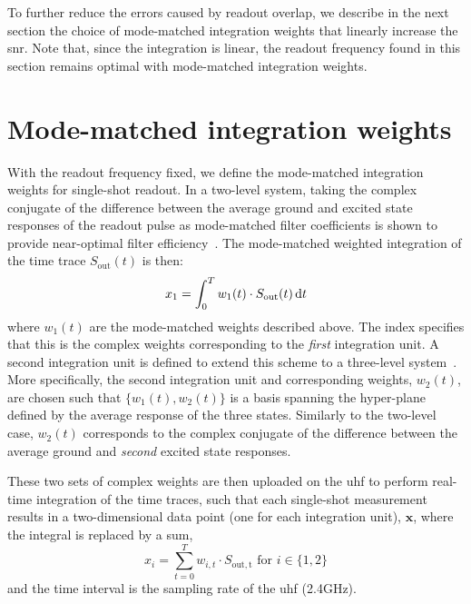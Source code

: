 To further reduce the errors caused by readout overlap, we describe in the next section the choice of mode-matched integration weights that linearly increase the \gls{snr}. Note that, since the integration is linear, the readout frequency found in this section remains optimal with mode-matched integration weights.

\section{Mode-matched integration weights} \label{s:mode_matched_integration}
With the readout frequency fixed, we define the mode-matched integration weights for single-shot readout. In a two-level system, taking the complex conjugate of the difference between the average ground and excited state responses of the readout pulse as mode-matched filter coefficients is shown to provide near-optimal filter efficiency~\cite{Heinsoo2018, Gambetta2007, Bultink2018}. The mode-matched weighted integration of the time trace $S_{\mathrm{out}}(t)$ is then: 
\begin{equation}
    x_1 = \int_{0}^{T}{w_{1}(t)\cdot S_{\mathrm{out}}(t)\,\mathrm d t} 
\end{equation}
where $w_{1}(t)$ are the mode-matched weights described above. The index specifies that this is the complex weights corresponding to the \textit{first} integration unit.
A second integration unit is defined to extend this scheme to a three-level system~\cite{Reuer2018}. More specifically, the second integration unit and corresponding weights, $w_2(t)$, are chosen such that $\{w_{1}(t), w_{2}(t)\}$ is a basis spanning the hyper-plane defined by the average response of the three states. Similarly to the two-level case, $w_{2}(t)$ corresponds to the complex conjugate of the difference between the average ground and \textit{second} excited state responses.

These two sets of complex weights are then uploaded on the \gls{uhf} to perform real-time integration of the time traces, such that each single-shot measurement results in a two-dimensional data point (one for each integration unit), $\bm{x}$, where the integral is replaced by a sum,
\begin{equation}
        x_i = \sum_{t=0}^{T}{w_{i,t}\cdot S_\mathrm{out, t}} \text{ for $i \in \{1,2\}$}
\end{equation}
and the time interval is the sampling rate of the \gls{uhf} (2.4\unit{GHz}).

